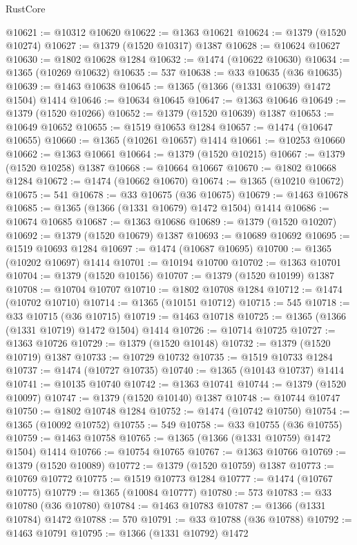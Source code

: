 \begin{lexlean}{RustCore}
\begin{coremodule}
@10621 := @10312 @10620
@10622 := @1363 @10621
@10624 := @1379 (@1520 @10274)
@10627 := @1379 (@1520 @10317) @1387
@10628 := @10624 @10627
@10630 := @1802 @10628 @1284
@10632 := @1474 (@10622 @10630)
@10634 := @1365 (@10269 @10632)
@10635 := 537
@10638 := @33 @10635 (@36 @10635)
@10639 := @1463 @10638
@10645 := @1365 (@1366 (@1331 @10639) @1472 @1504) @1414
@10646 := @10634 @10645
@10647 := @1363 @10646
@10649 := @1379 (@1520 @10266)
@10652 := @1379 (@1520 @10639) @1387
@10653 := @10649 @10652
@10655 := @1519 @10653 @1284
@10657 := @1474 (@10647 @10655)
@10660 := @1365 (@10261 @10657) @1414
@10661 := @10253 @10660
@10662 := @1363 @10661
@10664 := @1379 (@1520 @10215)
@10667 := @1379 (@1520 @10258) @1387
@10668 := @10664 @10667
@10670 := @1802 @10668 @1284
@10672 := @1474 (@10662 @10670)
@10674 := @1365 (@10210 @10672)
@10675 := 541
@10678 := @33 @10675 (@36 @10675)
@10679 := @1463 @10678
@10685 := @1365 (@1366 (@1331 @10679) @1472 @1504) @1414
@10686 := @10674 @10685
@10687 := @1363 @10686
@10689 := @1379 (@1520 @10207)
@10692 := @1379 (@1520 @10679) @1387
@10693 := @10689 @10692
@10695 := @1519 @10693 @1284
@10697 := @1474 (@10687 @10695)
@10700 := @1365 (@10202 @10697) @1414
@10701 := @10194 @10700
@10702 := @1363 @10701
@10704 := @1379 (@1520 @10156)
@10707 := @1379 (@1520 @10199) @1387
@10708 := @10704 @10707
@10710 := @1802 @10708 @1284
@10712 := @1474 (@10702 @10710)
@10714 := @1365 (@10151 @10712)
@10715 := 545
@10718 := @33 @10715 (@36 @10715)
@10719 := @1463 @10718
@10725 := @1365 (@1366 (@1331 @10719) @1472 @1504) @1414
@10726 := @10714 @10725
@10727 := @1363 @10726
@10729 := @1379 (@1520 @10148)
@10732 := @1379 (@1520 @10719) @1387
@10733 := @10729 @10732
@10735 := @1519 @10733 @1284
@10737 := @1474 (@10727 @10735)
@10740 := @1365 (@10143 @10737) @1414
@10741 := @10135 @10740
@10742 := @1363 @10741
@10744 := @1379 (@1520 @10097)
@10747 := @1379 (@1520 @10140) @1387
@10748 := @10744 @10747
@10750 := @1802 @10748 @1284
@10752 := @1474 (@10742 @10750)
@10754 := @1365 (@10092 @10752)
@10755 := 549
@10758 := @33 @10755 (@36 @10755)
@10759 := @1463 @10758
@10765 := @1365 (@1366 (@1331 @10759) @1472 @1504) @1414
@10766 := @10754 @10765
@10767 := @1363 @10766
@10769 := @1379 (@1520 @10089)
@10772 := @1379 (@1520 @10759) @1387
@10773 := @10769 @10772
@10775 := @1519 @10773 @1284
@10777 := @1474 (@10767 @10775)
@10779 := @1365 (@10084 @10777)
@10780 := 573
@10783 := @33 @10780 (@36 @10780)
@10784 := @1463 @10783
@10787 := @1366 (@1331 @10784) @1472
@10788 := 570
@10791 := @33 @10788 (@36 @10788)
@10792 := @1463 @10791
@10795 := @1366 (@1331 @10792) @1472

\end{coremodule}
\end{lexlean}
